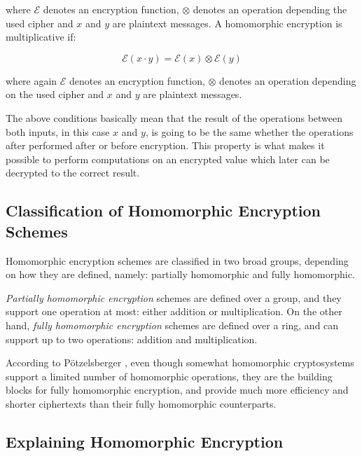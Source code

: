 where $\mathcal{E}$ denotes an encryption function, $\otimes$ denotes an operation depending the used cipher and $x$ and $y$ are plaintext messages. A homomorphic encryption is multiplicative if:

\begin{equation}
\mathcal{E}(x \cdot y) = \mathcal{E}(x) \otimes \mathcal{E}(y)
\end{equation}

where again $\mathcal{E}$ denotes an encryption function, $\otimes$ denotes an operation depending on the used cipher and $x$ and $y$ are plaintext messages.

The above conditions basically mean that the result of the operations between both inputs, in this case $x$ and $y$, is going to be the same whether the operations after performed after or before encryption. This property is what makes it possible to perform computations on an encrypted value which later can be decrypted to the correct result.

\subsection{Classification of Homomorphic Encryption Schemes}

Homomorphic encryption schemes are classified in two broad groups, depending on how they are defined, namely: partially homomorphic and fully homomorphic. 

\textit{Partially homomorphic encryption} schemes are defined over a group, and they support one operation at most: either addition or multiplication. On the other hand, \textit{fully homomorphic encryption} schemes are defined over a ring, and can support up to two operations: addition and multiplication.

According to P{\"o}tzelsberger \cite{potzelsberger2013kv}, even though somewhat homomorphic cryptosystems support a limited number of homomorphic operations, they are the building blocks for fully homomorphic encryption, and provide much more efficiency and shorter ciphertexts than their fully homomorphic counterparts. 


\subsection{Explaining Homomorphic Encryption}

